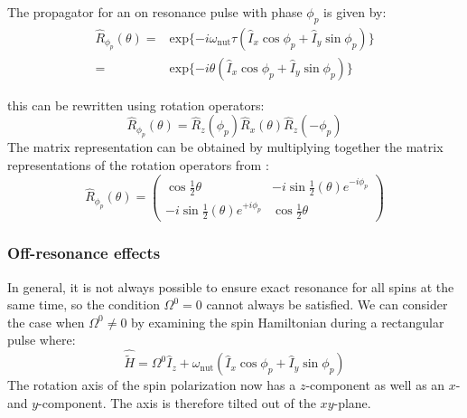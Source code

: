 The propagator for an on resonance pulse with phase $\phi_p$ is given by:
\begin{align}
  \hat{R}_{\phi_p}(\theta) =& \text{exp}\{-i\omega_{\text{nut}}\tau(\hat{I}_x\cos\phi_p + \hat{I}_y\sin\phi_p)\}\\
  =& \text{exp}\{-i\theta(\hat{I}_x\cos\phi_p + \hat{I}_y\sin\phi_p)\}
\end{align}

this can be rewritten using rotation operators:
\begin{equation}
  \hat{R}_{\phi_p}(\theta) = \hat{R}_z(\phi_p)\hat{R}_x(\theta)\hat{R}_z(-\phi_p)
\end{equation}
The matrix representation can be obtained by multiplying together the matrix
representations of the rotation operators from :
\begin{equation}
  \hat{R}_{\phi_p}(\theta) = \begin{pmatrix}
    \cos\frac{1}{2}\theta & -i\sin\frac{1}{2}(\theta)e^{-i\phi_p}\\
    -i\sin\frac{1}{2}(\theta)e^{+i\phi_p} & \cos\frac{1}{2}\theta
\end{pmatrix}
\end{equation}

\subsubsection{Off-resonance effects}

In general, it is not always possible to ensure exact resonance for all spins at the same
time, so the condition $\Omega^0 = 0$ cannot always be satisfied. We can consider the
case when $\Omega^0 \neq 0$ by examining the spin Hamiltonian during a rectangular
pulse where:
\begin{equation}
  \hat{\tilde{H}} = \Omega^0\hat{I}_z + \omega_{\text{nut}}(\hat{I}_x\cos\phi_p + \hat{I}_y\sin\phi_p)
\end{equation}
The rotation axis of the spin polarization now has a $z$-component as well as an $x$- and $y$-component. The
axis is therefore tilted out of the $xy$-plane.

